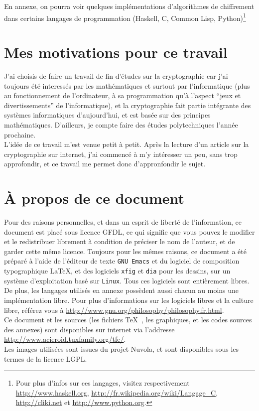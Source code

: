 En annexe, on pourra voir quelques implémentations d'algorithmes de chiffrement dans certains langages de programmation (Haskell, C, Common Lisp, Python)\footnote{Pour plus d'infos sur ces langages, visitez respectivement \url{http://www.haskell.org}, \url{http://fr.wikipedia.org/wiki/Langage_C}, \url{http://cliki.net} et \url{http://www.python.org}.} \\

\section{Mes motivations pour ce travail}
J'ai choisis de faire un travail de fin d'études sur la cryptographie car j'ai toujours été interessés par les mathématiques et surtout par l'informatique (plus au fonctionnement de l'ordinateur, à sa programmation qu'à l'aspect ``jeux et divertissements'' de l'informatique), et la cryptographie fait partie intégrante des systèmes informatiques d'aujourd'hui, et est basée sur des principes mathématiques. D'ailleurs, je compte faire des études polytechniques l'année prochaine. \\
L'idée de ce travail m'est venue petit à petit. Après la lecture d'un article sur la cryptographie sur internet, j'ai commencé à m'y intéresser un peu, sans trop approfondir, et ce travail me permet donc d'appronfondir le sujet.

\section{À propos de ce document}
Pour des raisons personnelles, et dans un esprit de liberté de l'information, ce document est placé sous licence GFDL, ce qui signifie que vous pouvez le modifier et le redistribuer librement à condition de préciser le nom de l'auteur, et de garder cette même licence. Toujours pour les mêmes raisons, ce document a été préparé à l'aide de l'éditeur de texte \texttt{GNU Emacs} et du logiciel de composition typographique \LaTeX, et des logiciels \texttt{xfig} et \texttt{dia} pour les dessins, sur un système d'exploitation basé sur \texttt{Linux}. Tous ces logiciels sont  entièrement libres. De plus, les langages utilisés en annexe possèdent aussi chacun au moins une implémentation libre. Pour plus d'informations sur les logiciels libres et la culture libre, référez vous à \url{http://www.gnu.org/philosophy/philosophy.fr.html}. \\
Ce document et les sources (les fichiers \TeX~, les graphiques,  et les codes sources des annexes) sont disponibles sur internet via l'addresse \url{http://www.acieroid.tuxfamily.org/tfe/}. \\
Les images utilisées sont issues du projet Nuvola, et sont disponibles sous les termes de la licence LGPL.
